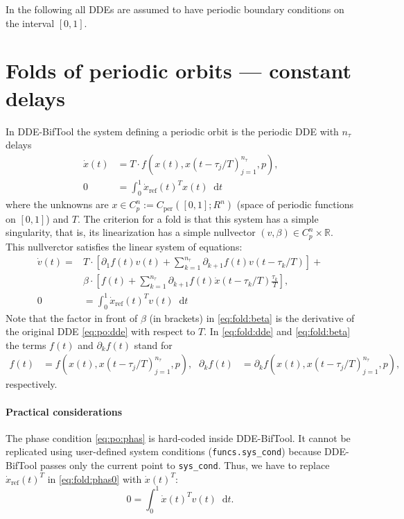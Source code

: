 \documentclass[11pt]{scrartcl}
\renewcommand{\d}{\mathop{}\!\mathrm{d}}
\newcommand{\R}{\mathbb{R}}
\newcommand{\blist}[1]{\mbox{\lstinline!#1!}}
\begin{document}
In the following all DDEs are assumed to have periodic boundary
conditions on the interval $[0,1]$.

\section{Folds of periodic orbits --- constant delays}
\label{sec:ext:fold}
In DDE-BifTool the system defining a periodic orbit is the periodic
DDE with $n_\tau$ delays
\begin{align}
  \label{eq:po:dde}
  \dot x(t)&=T\cdot f\left(x(t),x(t-\tau_j/T)_{j=1}^{n_\tau},p\right)\mbox{,}\\
  \label{eq:po:phas}
  0&=\int_0^1\dot x_\mathrm{ref}(t)^Tx(t)\d t
\end{align}
where the unknowns are $x\in C_p^n:=C_\mathrm{per}([0,1];R^n)$ (space
of periodic functions on $[0,1]$) and $T$. The criterion for a fold is
that this system has a simple singularity, that is, its linearization
has a simple nullvector $(v,\beta)\in C_p^n\times\R$. This nullverctor
satisfies the linear system of equations:
\begin{align}
  \label{eq:fold:dde}
  \dot v(t)=&T\cdot
  \left[\partial_1f(t)v(t)+\sum_{k=1}^{n_\tau}\partial_{k+1}f(t)v(t-\tau_k/T)\right]+\\
  \label{eq:fold:beta}
  &\beta\cdot\left[f(t)+
    \sum_{k=1}^{n_\tau}\partial_{k+1}f(t)\dot x(t-\tau_k/T)\frac{\tau_k}{T}\right]\mbox{,}\\
  \label{eq:fold:phas0}
  0&=\int_0^1\dot x_\mathrm{ref}(t)^Tv(t)\d t
\end{align}
Note that the factor in front of $\beta$ (in brackets) in
\eqref{eq:fold:beta} is the derivative of the original DDE
\eqref{eq:po:dde} with respect to $T$. In \eqref{eq:fold:dde} and
\eqref{eq:fold:beta} the terms $f(t)$ and $\partial_kf(t)$ stand for
\begin{align}\label{eq:ftdef}
  f(t)&=f\left(x(t),x(t-\tau_j/T)_{j=1}^{n_\tau},p\right)\mbox{,}&
  \partial_kf(t)&=\partial_kf\left(x(t),x(t-\tau_j/T)_{j=1}^{n_\tau},p\right)\mbox{,}
\end{align}
respectively.

\paragraph{Practical considerations}
The phase condition \eqref{eq:po:phas} is hard-coded inside
DDE-BifTool. It cannot be replicated using user-defined system
conditions (\blist{funcs.sys_cond}) because DDE-BifTool passes only
the current point to \blist{sys_cond}. Thus, we have to replace $\dot
x_\mathrm{ref}(t)^T$ in \eqref{eq:fold:phas0} with $\dot
x(t)^T$:
\begin{equation}
  \label{eq:fold:phas}
  0=\int_0^1\dot x(t)^Tv(t)\d t\mbox{.}
\end{equation}
\end{document}
